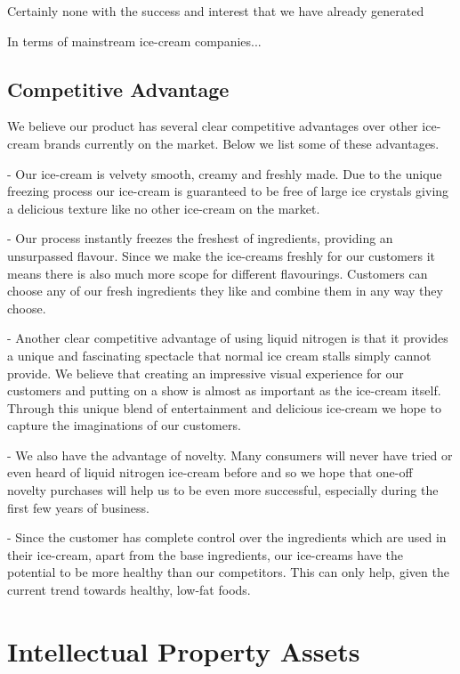 \documentclass{article}
\begin{document}
  Certainly none with the success and interest that we have already generated

  In terms of mainstream ice-cream companies...


  \subsection{Competitive Advantage}

We believe our product has several clear competitive advantages over
other ice-cream brands currently on the market. Below we list some of these advantages.

 - Our ice-cream is velvety smooth, creamy and freshly made. Due to
the unique freezing process our ice-cream is guaranteed to be free of
large ice crystals giving a delicious texture like no other ice-cream on the
market.

 - Our process instantly freezes the freshest of ingredients, providing
an unsurpassed flavour. Since we make the ice-creams freshly for
our customers it means there is also much more scope for different
flavourings. Customers can choose any of our fresh ingredients they like and combine them in any way they choose.

 - Another clear competitive advantage of using liquid nitrogen is that
it provides a unique and fascinating spectacle that normal ice cream
stalls simply cannot provide. We believe that creating an impressive
visual experience for our customers and putting on a show is almost
as important as the ice-cream itself. Through this unique blend
of entertainment and delicious ice-cream we hope to capture the
imaginations of our customers.

 - We also have the advantage of novelty. Many consumers will never
have tried or even heard of liquid nitrogen ice-cream before and so
we hope that one-off novelty purchases will help us to be even more
successful, especially during the first few years of business.

 - Since the customer has complete control over the ingredients which are used in their ice-cream, apart from the base ingredients, our ice-creams have the potential to be more healthy than our competitors. This can only help, given the current trend towards healthy, low-fat foods.

\section{Intellectual Property Assets}
\end{document}
